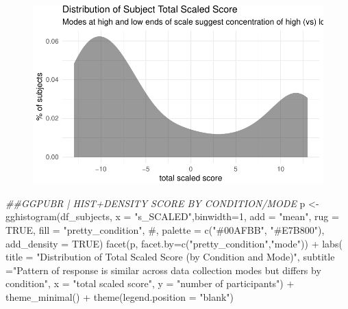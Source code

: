 \documentclass[
  letterpaper,
  DIV=11,
  numbers=noendperiod]{scrreprt}
\newenvironment{Shaded}{\begin{snugshade}}{\end{snugshade}}
\newcommand{\AttributeTok}[1]{\textcolor[rgb]{0.40,0.45,0.13}{#1}}
\newcommand{\CommentTok}[1]{\textcolor[rgb]{0.37,0.37,0.37}{#1}}
\newcommand{\ConstantTok}[1]{\textcolor[rgb]{0.56,0.35,0.01}{#1}}
\newcommand{\DecValTok}[1]{\textcolor[rgb]{0.68,0.00,0.00}{#1}}
\newcommand{\DocumentationTok}[1]{\textcolor[rgb]{0.37,0.37,0.37}{\textit{#1}}}
\newcommand{\FunctionTok}[1]{\textcolor[rgb]{0.28,0.35,0.67}{#1}}
\newcommand{\NormalTok}[1]{\textcolor[rgb]{0.00,0.23,0.31}{#1}}
\newcommand{\OtherTok}[1]{\textcolor[rgb]{0.00,0.23,0.31}{#1}}
\newcommand{\SpecialCharTok}[1]{\textcolor[rgb]{0.37,0.37,0.37}{#1}}
\newcommand{\StringTok}[1]{\textcolor[rgb]{0.13,0.47,0.30}{#1}}
\begin{document}
\begin{figure}[H]

{\centering \includegraphics{analysis/SGC3A/3_sgc3A_description_files/figure-pdf/VIS-SUBJ-SCALED-1.pdf}

}

\end{figure}

\begin{Shaded}
\begin{Highlighting}[]
\DocumentationTok{\#\#GGPUBR | HIST+DENSITY SCORE BY CONDITION/MODE}
\NormalTok{p }\OtherTok{\textless{}{-}} \FunctionTok{gghistogram}\NormalTok{(df\_subjects, }\AttributeTok{x =} \StringTok{"s\_SCALED"}\NormalTok{,}\AttributeTok{binwidth=}\DecValTok{1}\NormalTok{,}
   \AttributeTok{add =} \StringTok{"mean"}\NormalTok{, }\AttributeTok{rug =} \ConstantTok{TRUE}\NormalTok{,}
   \AttributeTok{fill =} \StringTok{"pretty\_condition"}\NormalTok{, }\CommentTok{\#, palette = c("\#00AFBB", "\#E7B800"),}
   \AttributeTok{add\_density =} \ConstantTok{TRUE}\NormalTok{) }
\FunctionTok{facet}\NormalTok{(p, }\AttributeTok{facet.by=}\FunctionTok{c}\NormalTok{(}\StringTok{"pretty\_condition"}\NormalTok{,}\StringTok{"mode"}\NormalTok{)) }\SpecialCharTok{+} 
  \FunctionTok{labs}\NormalTok{( }\AttributeTok{title =} \StringTok{"Distribution of Total Scaled Score (by Condition and Mode)"}\NormalTok{,}
        \AttributeTok{subtitle =}\StringTok{"Pattern of response is similar across data collection modes but differs by condition"}\NormalTok{,}
        \AttributeTok{x =} \StringTok{"total scaled score"}\NormalTok{, }\AttributeTok{y =} \StringTok{"number of participants"}\NormalTok{) }\SpecialCharTok{+} 
  \FunctionTok{theme\_minimal}\NormalTok{() }\SpecialCharTok{+} \FunctionTok{theme}\NormalTok{(}\AttributeTok{legend.position =} \StringTok{"blank"}\NormalTok{) }
\end{Highlighting}
\end{Shaded}
\end{document}
